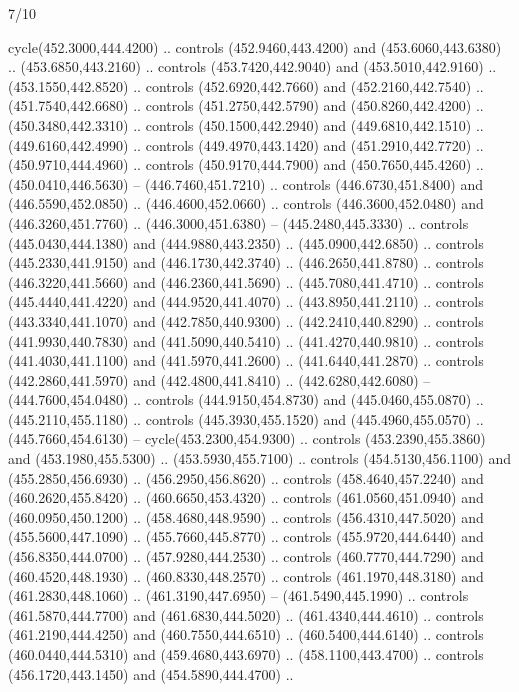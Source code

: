 \begin{flagdescription}{7/10}
\begin{scope}[xshift=0.5\flaglength]
\begin{scope}[scale=0.00185\flagwidth,yshift=245mm,xshift=-43.7mm]
\begin{scope}[y=-0.8pt, x=0.8pt, inner sep=0pt, outer sep=0pt]
\begin{scope}[shift={(-344.0678,183.89831)},fill=brown]
  cycle(452.3000,444.4200) .. controls (452.9460,443.4200) and
  (453.6060,443.6380) .. (453.6850,443.2160) .. controls (453.7420,442.9040) and
  (453.5010,442.9160) .. (453.1550,442.8520) .. controls (452.6920,442.7660) and
  (452.2160,442.7540) .. (451.7540,442.6680) .. controls (451.2750,442.5790) and
  (450.8260,442.4200) .. (450.3480,442.3310) .. controls (450.1500,442.2940) and
  (449.6810,442.1510) .. (449.6160,442.4990) .. controls (449.4970,443.1420) and
  (451.2910,442.7720) .. (450.9710,444.4960) .. controls (450.9170,444.7900) and
  (450.7650,445.4260) .. (450.0410,446.5630) -- (446.7460,451.7210) .. controls
  (446.6730,451.8400) and (446.5590,452.0850) .. (446.4600,452.0660) .. controls
  (446.3600,452.0480) and (446.3260,451.7760) .. (446.3000,451.6380) --
  (445.2480,445.3330) .. controls (445.0430,444.1380) and (444.9880,443.2350) ..
  (445.0900,442.6850) .. controls (445.2330,441.9150) and (446.1730,442.3740) ..
  (446.2650,441.8780) .. controls (446.3220,441.5660) and (446.2360,441.5690) ..
  (445.7080,441.4710) .. controls (445.4440,441.4220) and (444.9520,441.4070) ..
  (443.8950,441.2110) .. controls (443.3340,441.1070) and (442.7850,440.9300) ..
  (442.2410,440.8290) .. controls (441.9930,440.7830) and (441.5090,440.5410) ..
  (441.4270,440.9810) .. controls (441.4030,441.1100) and (441.5970,441.2600) ..
  (441.6440,441.2870) .. controls (442.2860,441.5970) and (442.4800,441.8410) ..
  (442.6280,442.6080) -- (444.7600,454.0480) .. controls (444.9150,454.8730) and
  (445.0460,455.0870) .. (445.2110,455.1180) .. controls (445.3930,455.1520) and
  (445.4960,455.0570) .. (445.7660,454.6130) -- cycle(453.2300,454.9300) ..
  controls (453.2390,455.3860) and (453.1980,455.5300) .. (453.5930,455.7100) ..
  controls (454.5130,456.1100) and (455.2850,456.6930) .. (456.2950,456.8620) ..
  controls (458.4640,457.2240) and (460.2620,455.8420) .. (460.6650,453.4320) ..
  controls (461.0560,451.0940) and (460.0950,450.1200) .. (458.4680,448.9590) ..
  controls (456.4310,447.5020) and (455.5600,447.1090) .. (455.7660,445.8770) ..
  controls (455.9720,444.6440) and (456.8350,444.0700) .. (457.9280,444.2530) ..
  controls (460.7770,444.7290) and (460.4520,448.1930) .. (460.8330,448.2570) ..
  controls (461.1970,448.3180) and (461.2830,448.1060) .. (461.3190,447.6950) --
  (461.5490,445.1990) .. controls (461.5870,444.7700) and (461.6830,444.5020) ..
  (461.4340,444.4610) .. controls (461.2190,444.4250) and (460.7550,444.6510) ..
  (460.5400,444.6140) .. controls (460.0440,444.5310) and (459.4680,443.6970) ..
  (458.1100,443.4700) .. controls (456.1720,443.1450) and (454.5890,444.4700) ..

\end{scope}
\end{scope}
\end{scope}
\end{scope}
\end{flagdescription}
